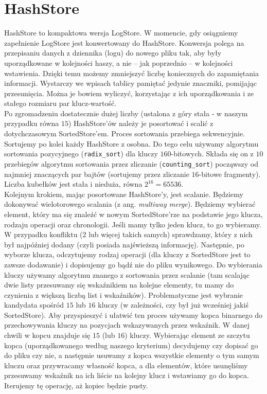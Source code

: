 \documentclass[declaration,shortabstract,masc]{iithesis}
\begin{document}
		\section{HashStore}
			HashStore to kompaktowa wersja LogStore. W momencie, gdy osiągniemy zapełnienie LogStore jest konwertowany do HashStore. Konwersja polega na przepisaniu danych z dziennika (logu) do nowego pliku tak, aby były uporządkowane w kolejności haszy, a nie -- jak poprzednio -- w kolejności wstawienia. Dzięki temu możemy zmniejszyć liczbę koniecznych do zapamiętania informacji. Wystarczy we wpisach tablicy pamiętać jedynie znaczniki, pomijając przesunięcia. Można je bowiem wyliczyć, korzystając z ich uporządkowania i ze stałego rozmiaru par klucz-wartość.\\
			\indent Po zgromadzeniu dostatecznie dużej liczby (ustalona z góry stała - w naszym przypadku równa $15$) HashStore'ów należy je posortować i scalić z dotychczasowym SortedStore'em. Proces sortowania przebiega sekwencyjnie. Sortujemy po kolei każdy HashStore z osobna. Do tego celu używamy algorytmu sortowania pozycyjnego (\texttt{radix\_sort}) dla kluczy $160$-bitowych. Składa się on z $10$ przebiegów algorytmu sortowania przez zliczanie (\texttt{counting\_sort}) począwszy od najmniej znaczących par bajtów (sortujemy przez zliczanie $16$-bitowe fragmenty). Liczba kubełków jest stała i nieduża, równa $2^{16} = 65536$.\\
			\indent Kolejnym krokiem, mając posortowane HashStore'y, jest scalanie. Będziemy dokonywać wielotorowego scalania (z ang. \textit{multiway merge}). Będziemy wybierać element, który ma się znaleźć w nowym SortedStore'rze na podstawie jego klucza, rodzaju operacji oraz chronologii. Jeśli mamy tylko jeden klucz, to go wybieramy. W przypadku konfliktu (2 lub więcej takich samych) sprawdzamy, który z nich był najpóźniej dodany (czyli posiada najświeższą informację). Następnie, po wyborze klucza, odczytujemy rodzaj operacji (dla kluczy z SortedStore jest to zawsze dodawanie) i dopisujemy go bądź nie do pliku wynikowego. Do wybierania kluczy używamy algorytmu znanego z sortowania przez scalanie (tam scalając dwie listy przesuwamy się wskaźnikiem na kolejne elementy, tu mamy do czynienia z większą liczbą list i wskaźników). Problematyczne jest wybranie kandydata spośród $15$ lub $16$ kluczy (w zależności, czy był już wcześniej jakiś SortedStore). Aby przyspieszyć i ułatwić ten proces używamy kopca binarnego do przechowywania kluczy na pozycjach wskazywanych przez wskaźnik. W danej chwili w kopcu znajduje się $15$ (lub $16$) kluczy. Wybierając element ze szczytu kopca (uporządkowanego według naszego kryterium) decydujemy czy dopisać go do pliku czy nie, a następnie usuwamy z kopca wszystkie elementy o tym samym kluczu oraz przywracamy własność kopca, a dla elementów, które usunęliśmy przesuwamy wskaźnik na ich liście na kolejny klucz i wstawiamy go do kopca. Iterujemy tę operację, aż kopiec będzie pusty.
\end{document}
